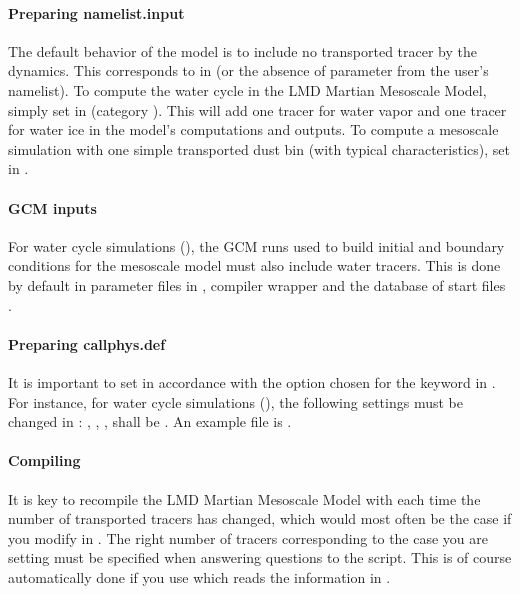 \paragraph{Preparing namelist.input} The default behavior of the model is to include no transported tracer by the dynamics. This corresponds to  in  (or the absence of parameter  from the user's namelist). To compute the water cycle in the LMD Martian Mesoscale Model, simply set  in  (category ). This will add one tracer for water vapor and one tracer for water ice in the model's computations and outputs. To compute a mesoscale simulation with one simple transported dust bin (with typical characteristics), set  in .

\paragraph{GCM inputs} For water cycle simulations (), the GCM runs used to build initial and boundary conditions for the mesoscale model must also include water tracers. This is done by default in parameter files in , compiler wrapper  and the database of start files .

\paragraph{Preparing callphys.def} It is important to set  in accordance with the option chosen for the keyword  in . For instance, for water cycle simulations (), the following settings must be changed in : , , ,  shall be . An example file is .

\paragraph{Compiling} It is key to recompile the LMD Martian Mesoscale Model with  each time the number of transported tracers has changed, which would most often be the case if you modify  in . The right number of tracers corresponding to the  case you are setting must be specified when answering questions to the  script. This is of course automatically done if you use  which reads the information in .


